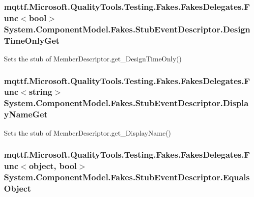 \hypertarget{class_system_1_1_component_model_1_1_fakes_1_1_stub_event_descriptor_a7af5c913233ad241cc71453011750d48}{
\subsubsection[{Design\-Time\-Only\-Get}]{\setlength{\rightskip}{0pt plus 5cm}mqttf.\-Microsoft.\-Quality\-Tools.\-Testing.\-Fakes.\-Fakes\-Delegates.\-Func$<$bool$>$ System.\-Component\-Model.\-Fakes.\-Stub\-Event\-Descriptor.\-Design\-Time\-Only\-Get}}\label{class_system_1_1_component_model_1_1_fakes_1_1_stub_event_descriptor_a7af5c913233ad241cc71453011750d48}


Sets the stub of Member\-Descriptor.\-get\-\_\-\-Design\-Time\-Only()

\hypertarget{class_system_1_1_component_model_1_1_fakes_1_1_stub_event_descriptor_a47742a4c77d30b5db7996fd1f7bdcb6c}{
\subsubsection[{Display\-Name\-Get}]{\setlength{\rightskip}{0pt plus 5cm}mqttf.\-Microsoft.\-Quality\-Tools.\-Testing.\-Fakes.\-Fakes\-Delegates.\-Func$<$string$>$ System.\-Component\-Model.\-Fakes.\-Stub\-Event\-Descriptor.\-Display\-Name\-Get}}\label{class_system_1_1_component_model_1_1_fakes_1_1_stub_event_descriptor_a47742a4c77d30b5db7996fd1f7bdcb6c}


Sets the stub of Member\-Descriptor.\-get\-\_\-\-Display\-Name()

\hypertarget{class_system_1_1_component_model_1_1_fakes_1_1_stub_event_descriptor_a16ce9b1d72559df56a164fc73ef34ea2}{
\subsubsection[{Equals\-Object}]{\setlength{\rightskip}{0pt plus 5cm}mqttf.\-Microsoft.\-Quality\-Tools.\-Testing.\-Fakes.\-Fakes\-Delegates.\-Func$<$object, bool$>$ System.\-Component\-Model.\-Fakes.\-Stub\-Event\-Descriptor.\-Equals\-Object}}\label{class_system_1_1_component_model_1_1_fakes_1_1_stub_event_descriptor_a16ce9b1d72559df56a164fc73ef34ea2}


